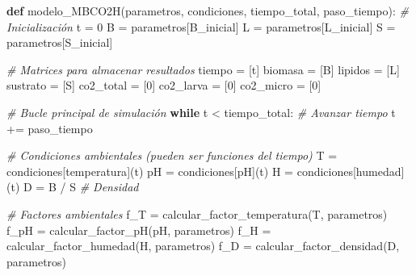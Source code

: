 \documentclass[
]{article}
\newenvironment{Shaded}{}{}
\newcommand{\CommentTok}[1]{\textcolor[rgb]{0.38,0.63,0.69}{\textit{#1}}}
\newcommand{\ControlFlowTok}[1]{\textcolor[rgb]{0.00,0.44,0.13}{\textbf{#1}}}
\newcommand{\DecValTok}[1]{\textcolor[rgb]{0.25,0.63,0.44}{#1}}
\newcommand{\KeywordTok}[1]{\textcolor[rgb]{0.00,0.44,0.13}{\textbf{#1}}}
\newcommand{\NormalTok}[1]{#1}
\newcommand{\OperatorTok}[1]{\textcolor[rgb]{0.40,0.40,0.40}{#1}}
\newcommand{\StringTok}[1]{\textcolor[rgb]{0.25,0.44,0.63}{#1}}
\begin{document}
\begin{Shaded}
\begin{Highlighting}[]
\KeywordTok{def}\NormalTok{ modelo\_MBCO2H(parametros, condiciones, tiempo\_total, paso\_tiempo):}
    \CommentTok{\# Inicialización}
\NormalTok{    t }\OperatorTok{=} \DecValTok{0}
\NormalTok{    B }\OperatorTok{=}\NormalTok{ parametros[}\StringTok{\textquotesingle{}B\_inicial\textquotesingle{}}\NormalTok{]}
\NormalTok{    L }\OperatorTok{=}\NormalTok{ parametros[}\StringTok{\textquotesingle{}L\_inicial\textquotesingle{}}\NormalTok{]}
\NormalTok{    S }\OperatorTok{=}\NormalTok{ parametros[}\StringTok{\textquotesingle{}S\_inicial\textquotesingle{}}\NormalTok{]}
    
    \CommentTok{\# Matrices para almacenar resultados}
\NormalTok{    tiempo }\OperatorTok{=}\NormalTok{ [t]}
\NormalTok{    biomasa }\OperatorTok{=}\NormalTok{ [B]}
\NormalTok{    lipidos }\OperatorTok{=}\NormalTok{ [L]}
\NormalTok{    sustrato }\OperatorTok{=}\NormalTok{ [S]}
\NormalTok{    co2\_total }\OperatorTok{=}\NormalTok{ [}\DecValTok{0}\NormalTok{]}
\NormalTok{    co2\_larva }\OperatorTok{=}\NormalTok{ [}\DecValTok{0}\NormalTok{]}
\NormalTok{    co2\_micro }\OperatorTok{=}\NormalTok{ [}\DecValTok{0}\NormalTok{]}
    
    \CommentTok{\# Bucle principal de simulación}
    \ControlFlowTok{while}\NormalTok{ t }\OperatorTok{\textless{}}\NormalTok{ tiempo\_total:}
        \CommentTok{\# Avanzar tiempo}
\NormalTok{        t }\OperatorTok{+=}\NormalTok{ paso\_tiempo}
        
        \CommentTok{\# Condiciones ambientales (pueden ser funciones del tiempo)}
\NormalTok{        T }\OperatorTok{=}\NormalTok{ condiciones[}\StringTok{\textquotesingle{}temperatura\textquotesingle{}}\NormalTok{](t)}
\NormalTok{        pH }\OperatorTok{=}\NormalTok{ condiciones[}\StringTok{\textquotesingle{}pH\textquotesingle{}}\NormalTok{](t)}
\NormalTok{        H }\OperatorTok{=}\NormalTok{ condiciones[}\StringTok{\textquotesingle{}humedad\textquotesingle{}}\NormalTok{](t)}
\NormalTok{        D }\OperatorTok{=}\NormalTok{ B }\OperatorTok{/}\NormalTok{ S  }\CommentTok{\# Densidad}
        
        \CommentTok{\# Factores ambientales}
\NormalTok{        f\_T }\OperatorTok{=}\NormalTok{ calcular\_factor\_temperatura(T, parametros)}
\NormalTok{        f\_pH }\OperatorTok{=}\NormalTok{ calcular\_factor\_pH(pH, parametros)}
\NormalTok{        f\_H }\OperatorTok{=}\NormalTok{ calcular\_factor\_humedad(H, parametros)}
\NormalTok{        f\_D }\OperatorTok{=}\NormalTok{ calcular\_factor\_densidad(D, parametros)}
        

\end{Highlighting}
\end{Shaded}
\end{document}
